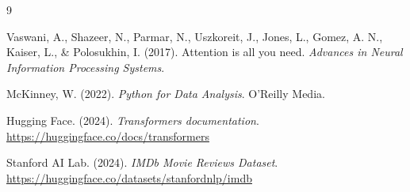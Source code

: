 \documentclass[11pt,letterpaper]{article}
\begin{document}
	\begin{thebibliography}{9}
		
		Vaswani, A., Shazeer, N., Parmar, N., Uszkoreit, J., Jones, L., Gomez, A. N., Kaiser, L., \& Polosukhin, I. (2017). Attention is all you need. \textit{Advances in Neural Information Processing Systems}.
		
		McKinney, W. (2022). \textit{Python for Data Analysis}. O'Reilly Media.
		
		Hugging Face. (2024). \textit{Transformers documentation}. \url{https://huggingface.co/docs/transformers}
		
		Stanford AI Lab. (2024). \textit{IMDb Movie Reviews Dataset}. \url{https://huggingface.co/datasets/stanfordnlp/imdb}
		
	\end{thebibliography}
	
\end{document}
